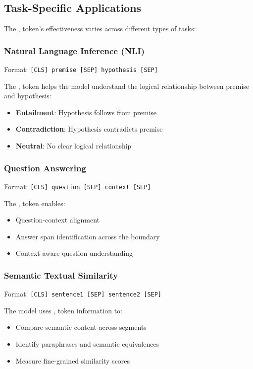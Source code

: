\subsection{Task-Specific Applications}

The \sep{} token's effectiveness varies across different types of tasks:

\subsubsection{Natural Language Inference (NLI)}
Format: \texttt{[CLS] premise [SEP] hypothesis [SEP]}

The \sep{} token helps the model understand the logical relationship between premise and hypothesis:
\begin{itemize}
\item \textbf{Entailment}: Hypothesis follows from premise
\item \textbf{Contradiction}: Hypothesis contradicts premise  
\item \textbf{Neutral}: No clear logical relationship
\end{itemize}

\subsubsection{Question Answering}
Format: \texttt{[CLS] question [SEP] context [SEP]}

The \sep{} token enables:
\begin{itemize}
\item Question-context alignment
\item Answer span identification across the boundary
\item Context-aware question understanding
\end{itemize}

\subsubsection{Semantic Textual Similarity}
Format: \texttt{[CLS] sentence1 [SEP] sentence2 [SEP]}

The model uses \sep{} token information to:
\begin{itemize}
\item Compare semantic content across segments
\item Identify paraphrases and semantic equivalences
\item Measure fine-grained similarity scores
\end{itemize}

